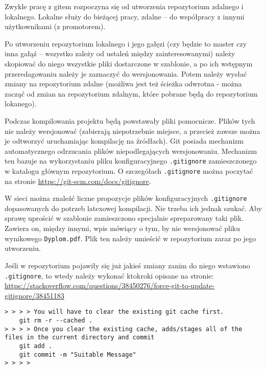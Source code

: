 Zwykle pracę z gitem rozpoczyna się od utworzenia repozytorium zdalnego i lokalnego. Lokalne służy do bieżącej pracy, zdalne -- do współpracy z innymi użytkownikami (z promotorem). 

Po utworzeniu repozytorium lokalnego i jego gałęzi (czy będzie to master czy inna gałąź -- wszystko zależy od ustaleń między zainteresowanymi) należy skopiować do niego wszystkie pliki dostarczone w szablonie, a po ich wstępnym przeredagowaniu należy je zaznaczyć do wersjonowania. Potem należy wysłać zmiany na repozytorium zdalne (możliwa jest też ścieżka odwrotna - można zacząć od zmian na repozytorium zdalnym, które pobrane będą do repozytorium lokanego).

Podczas kompilowania projektu będą powstawały pliki pomocnicze. Plików tych nie należy wersjonować (zabierają niepotrzebnie miejsce, a przecież zawsze można je odtworzyć uruchamiając kompilację na źródłach). Git posiada mechanizm automatycznego odrzucania plików niepodlegających wersjonowaniu. Mechanizm ten bazuje na wykorzystaniu pliku konfiguracyjnego \texttt{.gitignore} zamieszczonego w katalogu głównym repozytorium. O szczegółach \texttt{.gitignore} można poczytać  na stronie \url{https://git-scm.com/docs/gitignore}. 

W sieci można znaleźć liczne propozycje plików konfiguracyjnych \texttt{.gitignore} dopasowanych do potrzeb latexowej kompilacji. Nie trzeba ich jednak szukać. Aby sprawę uprościć w szablonie zamieszczono specjalnie spreparowany taki plik. Zawiera on, między innymi, wpis mówiący o tym, by nie wersjonować pliku wynikowego \texttt{Dyplom.pdf}. Plik ten należy umieścić w repozytorium zaraz po jego utworzeniu. 


Jeśli w repozytorium pojawiły się już jakieś zmiany zanim do niego wstawiono \texttt{.gitignore}, to wtedy należy wykonać ktokroki opisane na stronie: \url{https://stackoverflow.com/questions/38450276/force-git-to-update-gitignore/38451183}

\begin{lstlisting}[basicstyle=\small\ttfamily]
> > > > You will have to clear the existing git cache first.
    git rm -r --cached .
> > > > Once you clear the existing cache, adds/stages all of the files in the current directory and commit
    git add .
    git commit -m "Suitable Message"
> > > > 
\end{lstlisting}


